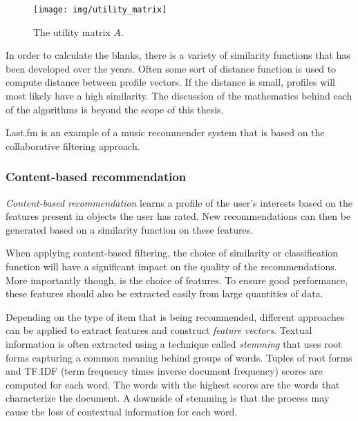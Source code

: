\begin{figure}%
\begin{center}
	\texttt{[image: img/utility\_matrix]}%
\end{center}
	\caption{The utility matrix $A$.}%
	\label{figure:utilitymatrix}%
\end{figure}

In order to calculate the blanks, there is a variety of similarity functions that has been developed over the years. Often some sort of distance function is used to compute distance between profile vectors. If the distance is small, profiles will most likely have a high similarity\cite{rajaraman:2012}. The discussion of the mathematics behind each of the algorithms is beyond the scope of this thesis.

Last.fm is an example of a music recommender system that is based on the collaborative filtering approach\cite{levy:2010}.


\subsubsection{Content-based recommendation}\label{chapter:literature_study:section:computer:subsection:algorithms:subsubsection:cbf}

\emph{Content-based recommendation} learns a profile of the user's interests based on the features present in objects the user has rated. New recommendations can then be generated based on a similarity function on these features\cite{burke:2002, pazzani:2007:CRS:1768197.1768209}.

When applying content-based filtering, the choice of similarity or classification function will have a significant impact on the quality of the recommendations. More importantly though, is the choice of features. To ensure good performance, these features should also be extracted easily from large quantities of data.

Depending on the type of item that is being recommended, different approaches can be applied to extract features and construct \emph{feature vectors}. Textual information is often extracted using a technique called \emph{stemming} that uses root forms capturing a common meaning behind groups of words. Tuples of root forms and TF.IDF (term frequency times inverse document frequency)  scores are computed for each word\cite{pazzani:2007:CRS:1768197.1768209, rajaraman:2012}. The words with the highest scores are the words that characterize the document\cite{rajaraman:2012}. A downside of stemming is that the process may cause the loss of contextual information for each word\cite{pazzani:2007:CRS:1768197.1768209}.


